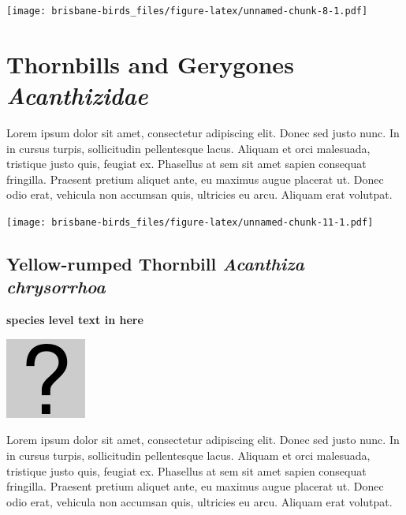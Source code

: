 \documentclass[]{book}
\let\origfigure\figure
\let\endorigfigure\endfigure
\renewenvironment{figure}[1][2] {
  \expandafter\origfigure\expandafter[H]
} {
  \endorigfigure
}
\begin{document}
\begin{figure}
\centering
\texttt{[image: brisbane-birds\_files/figure-latex/unnamed-chunk-8-1.pdf]}
\caption{\label{fig:unnamed-chunk-8}insert figure caption}
\end{figure}

\chapter{\texorpdfstring{Thornbills and Gerygones
\emph{Acanthizidae}}{Thornbills and Gerygones Acanthizidae}}\label{thornbills-and-gerygones-acanthizidae}

Lorem ipsum dolor sit amet, consectetur adipiscing elit. Donec sed justo
nunc. In in cursus turpis, sollicitudin pellentesque lacus. Aliquam et
orci malesuada, tristique justo quis, feugiat ex. Phasellus at sem sit
amet sapien consequat fringilla. Praesent pretium aliquet ante, eu
maximus augue placerat ut. Donec odio erat, vehicula non accumsan quis,
ultricies eu arcu. Aliquam erat volutpat.

\texttt{[image: brisbane-birds\_files/figure-latex/unnamed-chunk-11-1.pdf]}

\section{\texorpdfstring{Yellow-rumped Thornbill \emph{Acanthiza
chrysorrhoa}}{Yellow-rumped Thornbill Acanthiza chrysorrhoa}}\label{yellow-rumped-thornbill-acanthiza-chrysorrhoa}

\textbf{species level text in here}

\begin{figure}
\centering
\includegraphics{assets/missing.png}
\caption{No image for species}
\end{figure}

Lorem ipsum dolor sit amet, consectetur adipiscing elit. Donec sed justo
nunc. In in cursus turpis, sollicitudin pellentesque lacus. Aliquam et
orci malesuada, tristique justo quis, feugiat ex. Phasellus at sem sit
amet sapien consequat fringilla. Praesent pretium aliquet ante, eu
maximus augue placerat ut. Donec odio erat, vehicula non accumsan quis,
ultricies eu arcu. Aliquam erat volutpat.
\end{document}
